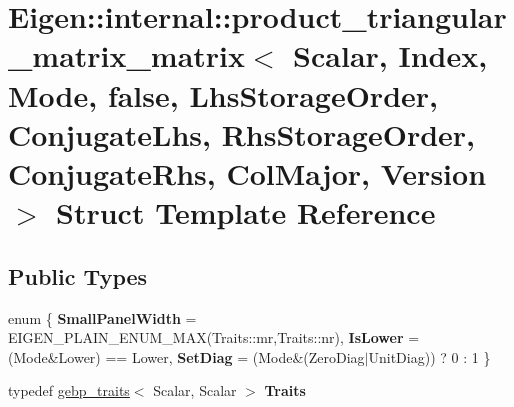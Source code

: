 \hypertarget{struct_eigen_1_1internal_1_1product__triangular__matrix__matrix_3_01_scalar_00_01_index_00_01_mo073ec17ef20b8a50e2a38e240dd8d795}{}\section{Eigen\+::internal\+::product\+\_\+triangular\+\_\+matrix\+\_\+matrix$<$ Scalar, Index, Mode, false, Lhs\+Storage\+Order, Conjugate\+Lhs, Rhs\+Storage\+Order, Conjugate\+Rhs, Col\+Major, Version $>$ Struct Template Reference}
\label{struct_eigen_1_1internal_1_1product__triangular__matrix__matrix_3_01_scalar_00_01_index_00_01_mo073ec17ef20b8a50e2a38e240dd8d795}
\subsection*{Public Types}
\begin{DoxyCompactItemize}
\item 
\mbox{\label{struct_eigen_1_1internal_1_1product__triangular__matrix__matrix_3_01_scalar_00_01_index_00_01_mo073ec17ef20b8a50e2a38e240dd8d795_affa7a8430beb64fab4f5ea73f18f1542}} 
enum \{ {\bfseries Small\+Panel\+Width} = E\+I\+G\+E\+N\+\_\+\+P\+L\+A\+I\+N\+\_\+\+E\+N\+U\+M\+\_\+\+M\+AX(Traits\+::mr,Traits\+::nr), 
{\bfseries Is\+Lower} = (Mode\&Lower) == Lower, 
{\bfseries Set\+Diag} = (Mode\&(Zero\+Diag$\vert$\+Unit\+Diag)) ? 0 \+: 1
 \}
\item 
\mbox{\label{struct_eigen_1_1internal_1_1product__triangular__matrix__matrix_3_01_scalar_00_01_index_00_01_mo073ec17ef20b8a50e2a38e240dd8d795_afbc7bbc5adffa2e0e67e9f13238fcf35}} 
typedef \mbox{\hyperlink{class_eigen_1_1internal_1_1gebp__traits}{gebp\+\_\+traits}}$<$ Scalar, Scalar $>$ {\bfseries Traits}
\end{DoxyCompactItemize}
